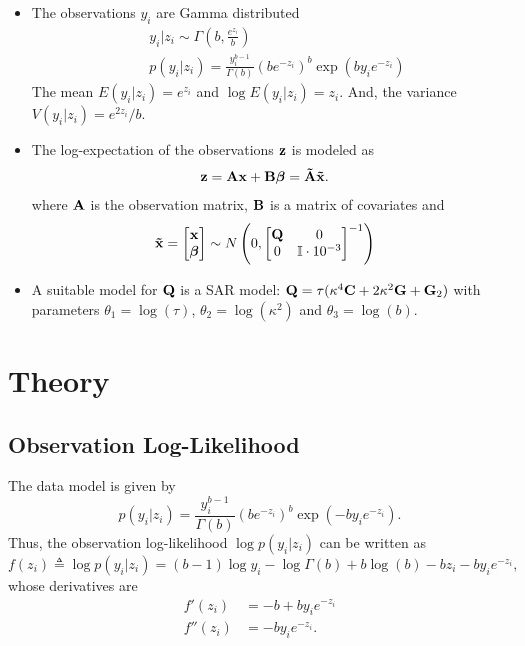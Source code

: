 \documentclass[a4paper,10pt]{article}
\def\bA{{\bf A}}
\def\bB{{\bf B}}
\def\bG{{\bf G}}
\def\bQ{{\bf Q}}
\def\bC{{\bf C}}
\def\btA{{\bf \tilde A}}
\def\bx{{\bf x}}
\def\bz{{\bf z}}
\def\btx{{\bf{\tilde x}}}
\def\bbeta{{\boldsymbol \beta}}
\begin{document}
\begin{itemize}
 \item The observations $y_i$ are Gamma distributed
 \begin{align*}
  & y_i|z_i \sim \Gamma \left( b , \frac{e^{z_i}}{b}\right) \\
  & p(y_i|z_i) = \frac{y_i^{b-1}}{\Gamma(b)} \left( b e^{-z_i} \right)^b \exp(b y_i e^{-z_i})
 \end{align*}
 The mean $E(y_i|z_i) = e^{z_i}$ and $\log E(y_i|z_i) = z_i$. And, the variance $V(y_i|z_i) = e^{2z_i}/b$.
 
 \item The log-expectation of the observations $\bz$ is modeled as 
 \begin{align*}
  & \bz = \bA \bx + \bB \bbeta = \btA \btx.
 \end{align*}
 where $\bA$ is the observation matrix, $\bB$ is a matrix of covariates and
 \begin{align*}
  &\btx = \begin{bmatrix}
          \bx \\
          \bbeta
         \end{bmatrix} \sim
         N\left( 0, \begin{bmatrix}
                     \bQ & 0 \\
                     0 & \mathbb{I} \cdot 10^{-3}
                    \end{bmatrix}^{-1}
 \right)
 \end{align*}
 \item A suitable model for $\bQ$ is a SAR model: $\bQ = \tau (\kappa^4 \bC + 2\kappa^2 \bG + \bG_2)$ with parameters $\theta_1 = \log (\tau)$,  $\theta_2 = \log (\kappa^2)$  and $\theta_3 = \log(b)$.
\end{itemize}


\section{Theory}
\subsection{Observation Log-Likelihood}
The data model is given by
\begin{equation}
 p(y_i|z_i) = \frac{y_i^{b-1}}{\Gamma(b)} (be^{-z_i})^b \exp (-by_ie^{-z_i}).
 \label{eq:datamodel}
\end{equation}
Thus, the observation log-likelihood $\log p(y_i|z_i)$ can be written as
\begin{equation*}
 f(z_i) \triangleq \log p(y_i|z_i) = (b-1) \log y_i - \log \Gamma(b) + b \log (b) - b z_i - b y_i e^{-z_i},
\end{equation*}
whose derivatives are
\begin{align*}
 f'(z_i) &= -b + b y_i e^{-z_i} \\
 f''(z_i) &= -b y_i e^{-z_i}.
\end{align*}
\end{document}
